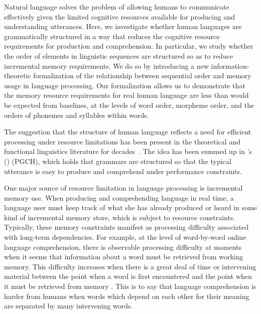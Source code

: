 
Natural language solves the problem of allowing humans to communicate effectively given the limited cognitive resources available for producing and understanding utterances. Here, we investigate whether human languages are grammatically structured in a way that reduces the cognitive resource requirements for production and comprehension. In particular, we study whether the order of elements in linguistic sequences are structured so as to reduce incremental memory requirements. We do so by introducing a new information-theoretic formalization of the relationship between sequential order and memory usage in language processing. Our formalization allows us to demonstrate that the memory resource requirements for real human language are less than would be expected from baselines, at the levels of word order, morpheme order, and the orders of phonemes and syllables within words. 

The suggestion that the structure of human language reflects a need for efficient processing under resource limitations has been present in the theoretical and functional linguistics literature for decades~\citep{yngve1961,berwick1984grammatical,hawkins1994performance,jaeger2011language,chomsky2005three,gibson2019efficiency}. The idea has been summed up in \citeauthor{hawkins1994efficiency}'s (\citeyear{hawkins1994efficiency})  (PGCH), which holds that grammars are structured so that the typical utterance is easy to produce and comprehend under performance constraints.

One major source of resource limitation in language processing is incremental memory use. 
When producing and comprehending language in real time, a language user must keep track of what she has already produced or heard in some kind of incremental memory store, which is subject to resource constraints.
Typically, these memory constraints manifest as processing difficulty associated with long-term dependencies.
For example, at the level of word-by-word online language comprehension, there is observable processing difficulty at moments when it seems that information about a word must be retrieved from working memory. 
This difficulty increases when there is a great deal of time or intervening material between the point when a word is first encountered and the point when it must be retrieved from memory  \citep{gibson1998syntactic,gibson1999memory,gibson2000dependency,mcelree,lewis2005activationbased,bartek2011search,nicenboim2015working}. 
This is to say that language comprehension is harder from humans when words which depend on each other for their meaning are separated by many intervening words.

